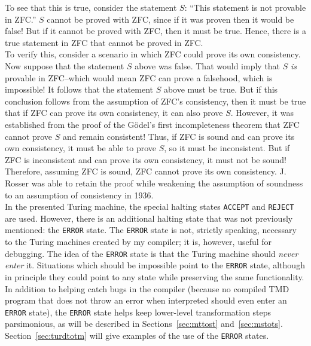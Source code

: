 To see that this is true, consider the statement $S$: ``This statement is not provable in ZFC.'' $S$ cannot be proved with ZFC, since if it was proven then it would be false! But if it cannot be proved with ZFC, then it must be true. Hence, there is a true statement in ZFC that cannot be proved in ZFC. \\

To verify this, consider a scenario in which ZFC could prove its own consistency. Now suppose that the statement $S$ above was false. That would imply that $S$ \emph{is} provable in ZFC--which would mean ZFC can prove a falsehood, which is impossible! It follows that the statement $S$ above must be true. But if this conclusion follows from the assumption of ZFC's consistency, then it must be true that if ZFC can prove its own consistency, it can also prove $S$. However, it was established from the proof of the G\"{o}del's first incompleteness theorem that ZFC cannot prove $S$ and remain consistent! Thus, if ZFC is sound and can prove its own consistency, it must be able to prove $S$, so it must be inconsistent. But if ZFC is inconsistent and can prove its own consistency, it must not be sound! Therefore, assuming ZFC is sound, ZFC cannot prove its own consistency. J. Rosser was able to retain the proof while weakening the assumption of soundness to an assumption of consistency in 1936. \\ %

In the presented Turing machine, the special halting states \texttt{ACCEPT} and \texttt{REJECT} are used. However, there is an additional halting state that was not previously mentioned: the \texttt{ERROR} state. The \texttt{ERROR} state is not, strictly speaking, necessary to the Turing machines created by my compiler; it is, however, useful for debugging. The idea of the \texttt{ERROR} state is that the Turing machine should \emph{never enter} it. Situations which should be impossible point to the \texttt{ERROR} state, although in principle they could point to any state while preserving the same functionality. In addition to helping catch bugs in the compiler (because no compiled TMD program that does not throw an error when interpreted should even enter an \texttt{ERROR} state), the \texttt{ERROR} state helps keep lower-level transformation steps parsimonious, as will be described in Sections~\ref{sec:mttost} and~\ref{sec:mstots}. Section~\ref{sec:turdtotm} will give examples of the use of the \texttt{ERROR} states. \\

